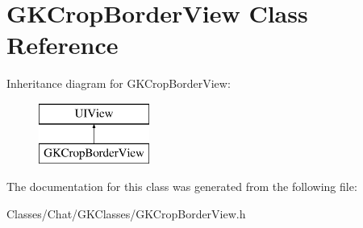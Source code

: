 \hypertarget{interface_g_k_crop_border_view}{}\section{G\+K\+Crop\+Border\+View Class Reference}
\label{interface_g_k_crop_border_view}
Inheritance diagram for G\+K\+Crop\+Border\+View\+:\begin{figure}[H]
\begin{center}
\leavevmode
\includegraphics[height=2.000000cm]{interface_g_k_crop_border_view}
\end{center}
\end{figure}


The documentation for this class was generated from the following file\+:\begin{DoxyCompactItemize}
\item 
Classes/\+Chat/\+G\+K\+Classes/G\+K\+Crop\+Border\+View.\+h\end{DoxyCompactItemize}
